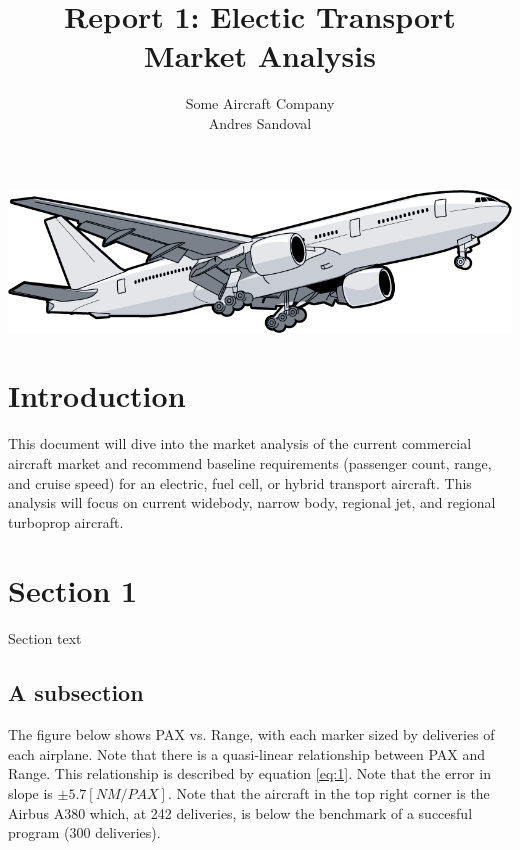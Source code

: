\documentclass[12pt]{article} %
\title{Report 1: Electic Transport Market Analysis}
\author{Some Aircraft Company \\ Andres Sandoval}
\begin{document}
\maketitle
\begin{center}
    \includegraphics[width=1\textwidth]{cover}
\end{center}

\graphicspath{ {./market_trade/} }

\pagebreak

\tableofcontents

\listoffigures

\pagebreak

\section{Introduction}

This document will dive into the market analysis of the current commercial aircraft market and recommend baseline requirements (passenger count, range, and cruise speed) for an electric, fuel cell, or hybrid transport aircraft. This analysis will focus on current widebody, narrow body, regional jet, and regional turboprop aircraft.

\section{Section 1}

Section text

\subsection{A subsection}

The figure below shows PAX vs. Range, with each marker sized by deliveries of each airplane. Note that there is a quasi-linear relationship between PAX and Range. This relationship is described by equation \ref{eq:1}. Note that the error in slope is $\pm 5.7 [NM/PAX]$. Note that the aircraft in the top right corner is the Airbus A380 which, at 242 deliveries, is below the benchmark of a succesful program (300 deliveries).
\end{document}

